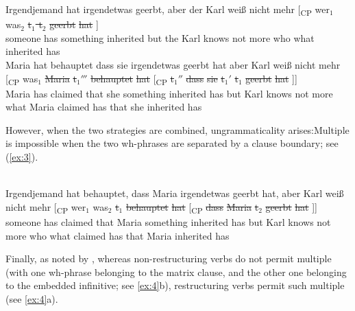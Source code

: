 \documentclass[output=paper]{langsci/langscibook}
\begin{document}
\ea\label{dg534} 
    \ea \gll Irgendjemand \label{dg534a}hat irgendetwas geerbt, aber der Karl
    wei{\ss} nicht mehr [\textsubscript{CP} wer$_1$ was$_2$ \sout{t$_1$ t$_2$} \sout{geerbt} \sout{hat} ]\\
        someone has something inherited but the Karl knows not more {} who what {} inherited has \\
    \ex  \gll Maria hat behauptet dass sie irgendetwas geerbt hat aber Karl wei{\ss} nicht mehr [\textsubscript{CP} was$_1$ \sout{Maria} \sout{t$_1'''$} \sout{behauptet} \sout{hat} [\textsubscript{CP} \sout{t$_1''$} \sout{dass} \sout{sie} \sout{t$_1'$} \sout{t$_1$} \sout{geerbt} \sout{hat} ]]\\
        Maria has claimed that she something inherited has but Karl knows not more {} what Maria {} claimed has \hspace{0mm} \hspace{0mm} that she {} \hspace{0mm} inherited has \\
    \z
\z

However, when the two strategies are combined, ungrammaticality
arises:\linebreak Multiple  is impossible when the two wh-phrases are
separated by a clause boundary; see (\ref{ex:3}).\newpage

\ea {}\\
    \gll \llap{*}Irgendjemand \label{unlod28}hat behauptet, dass Maria irgendetwas geerbt
hat, aber Karl wei{\ss} nicht mehr [\textsubscript{CP} wer$_1$ was$_2$
 \sout{t$_1$} \sout{behauptet} \sout{hat} [\textsubscript{CP}
\sout{dass} \sout{Maria} \sout{t$_2$} \sout{geerbt}
\sout{hat} ]] \\
someone has claimed that Maria something inherited has but
Karl knows not more {} who what \hspace{0mm} claimed has
\hspace{0mm} that Maria \hspace{0mm} inherited has \\\label{ex:3}
\z

Finally, as noted by \citet{Sauerland:99:loc}, whereas non-restructuring verbs
do not permit multiple  (with one wh-phrase belonging to the matrix
clause, and the other one belonging to the embedded infinitive; see
\ref{ex:4}b), restructuring verbs permit such multiple  (see
\ref{ex:4}a).
\end{document}
